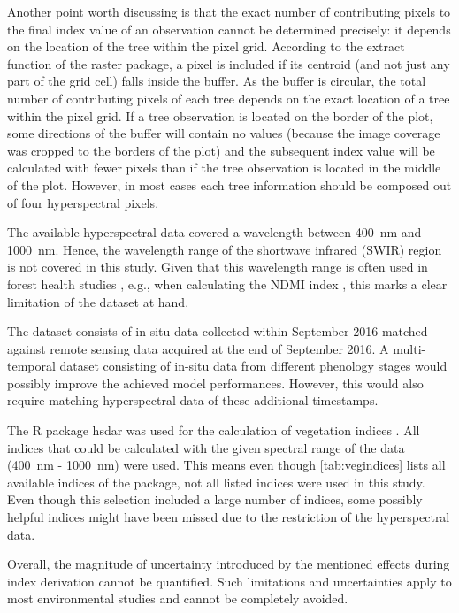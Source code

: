 \documentclass[remotesensing,article,submit,moreauthors,pdftex]{Definitions/mdpi}
\begin{document}
Another point worth discussing is that the exact number of contributing pixels to the final index value of an observation cannot be determined precisely: it depends on the location of the tree within the pixel grid.
According to the extract function of the raster package, a pixel is included if its centroid (and not just any part of the grid cell) falls inside the buffer.
As the buffer is circular, the total number of contributing pixels of each tree depends on the exact location of a tree within the pixel grid.
If a tree observation is located on the border of the plot, some directions of the buffer will contain no values (because the image coverage was cropped to the borders of the plot) and the subsequent index value will be calculated with fewer pixels than if the tree observation is located in the middle of the plot.
However, in most cases each tree information should be composed out of four hyperspectral pixels.

The available hyperspectral data covered a wavelength between 400~nm and 1000~nm.
Hence, the wavelength range of the shortwave infrared (SWIR) region is not covered in this study.
Given that this wavelength range is often used in forest health studies \cite{hais2019}, e.g., when calculating the \ac{NDMI} index \cite{gao1996}, this marks a clear limitation of the dataset at hand.

The dataset consists of in-situ data collected within September 2016 matched against remote sensing data acquired at the end of September 2016.
A multi-temporal dataset consisting of in-situ data from different phenology stages would possibly improve the achieved model performances.
However, this would also require matching hyperspectral data of these additional timestamps.

The R package hsdar was used for the calculation of vegetation indices \cite{lehnert2016}.
All indices that could be calculated with the given spectral range of the data (400~nm - 1000~nm) were used.
This means even though \autoref{tab:vegindices} lists all available indices of the package, not all listed indices were used in this study.
Even though this selection included a large number of indices, some possibly helpful indices might have been missed due to the restriction of the hyperspectral data.

Overall, the magnitude of uncertainty introduced by the mentioned effects during index derivation cannot be quantified.
Such limitations and uncertainties apply to most environmental studies and cannot be completely avoided.
\end{document}
